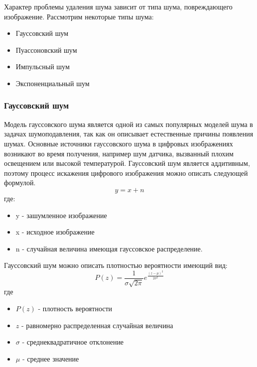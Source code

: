Характер проблемы удаления шума зависит от типа шума, повреждающего изображение. Рассмотрим некоторые типы шума:
\begin{itemize}
	\item Гауссовский шум
	\item Пуассоновский шум
	\item Импульсный шум
	\item Экспоненциальный шум
\end{itemize}


\subsubsection{Гауссовский  шум}
Модель гауссовского шума является одной из самых популярных моделей шума в задачах шумоподавления, так как он описывает естественные причины появления шумах.
Основные источники гауссовского шума в цифровых изображениях возникают во время получения, например шум датчика, вызванный плохим освещением или высокой температурой.
Гауссовский шум является аддитивным, поэтому процесс искажения цифрового изображения можно описать следующей формулой.
\begin{equation}
	y = x + n
\end{equation}
где:
\begin{itemize}
	\item y - зашумленное изображение 
	\item x - исходное изображение
	\item n - случайная величина имеющая гауссовское распределение.
\end{itemize}
Гауссовский шум можно описать плотностью вероятности имеющий вид:
\begin{equation}
	P(z)=\frac{1}{\sigma\sqrt{2\pi}}e^{\frac{(z-\mu)^2}{2\sigma^2}}
\end{equation}
где
\begin{itemize}
	\item $P(z)$ - плотность вероятности
	\item $z$ - равномерно распределенная случайная величина
	\item $\sigma$ - среднеквадратичное отклонение
	\item $\mu$ - среднее значение
\end{itemize}


